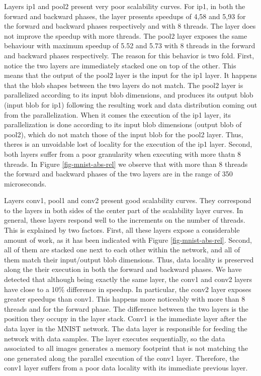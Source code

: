 Layers ip1 and pool2 present very poor scalability curves. 
For ip1, in both the forward and backward phases, the layer 
presents speedups of 4,58 and 5,93 for the forward and backward 
phases respectively and with 8 threads. The layer does not improve 
the speedup with more threads. The pool2 layer exposes the same 
behaviour with maximum speedup of 5.52 and 5.73 with 8 threads in 
the forward and backward phases respectively. The reason for this 
behavior is two fold. First, notice the two layers are immediately 
stacked one on top of the other. This means that the 
output of the pool2 layer is the input for the ip1 layer. It happens 
that the blob shapes between the two layers do not match. The pool2 
layer is parallelized according to its input blob dimensions, and 
produces its output blob (input blob for ip1) following the resulting 
work and data distribution coming out from the parallelization. When 
it comes the execution of the ip1 layer, its parallelization is done 
according to its input blob dimensions (output blob of pool2), which do 
not match those of the input blob for the pool2 layer. Thus, theres is 
an unvoidable lost of locality for the execution of the ip1 layer. 
Second, both layers suffer from a poor granularity when executing with 
more thatn 8 threads. In Figure \ref{fig-mnist-abs-rel} we observe that 
with more than 8 threads the forward and backward phases of the two layers 
are in the range of 350 microseconds.

Layers conv1, pool1 and conv2 present good scalability curves. They 
correspond to the layers in both sides of the center part of the 
scalability layer curves. In general, these layers respond well to the 
increments on the number of threads. This is explained by two factors. 
First, all these layers expose a considerable amount of work, as it has 
been indicated with Figure \ref{fig-mnist-abs-rel}. Second, all of them 
are stacked one next to each other within the network, and all of them 
match their input/output blob dimensions. Thus, data locality is 
preserved along the their execution in both the forward and backward phases.
We have detected that although being exactly the same layer, the conv1 
and conv2 layers have close to a 10\% difference in speedup. 
In particular, the conv2 layer exposes greater speedups than conv1. 
This happens more noticeably with more than 8 threads and for the 
forward phase. The difference between the two layers is the position 
they occupy in the layer stack. Conv1 is the immediate layer after the 
data layer in the MNIST network. The data layer is responsible for
feeding the network with data samples. The layer executes sequentially, 
so the data associated to all images generates a memory footprint that is 
not matching the one generated along the parallel execution of the 
conv1 layer. Therefore, the conv1 layer suffers from a poor data 
locality with its immediate previous layer.

